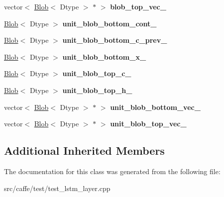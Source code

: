 \begin{DoxyCompactItemize}
vector$<$ \mbox{\hyperlink{classcaffe_1_1_blob}{Blob}}$<$ Dtype $>$ $\ast$ $>$ {\bfseries blob\+\_\+top\+\_\+vec\+\_\+}
\item 
\mbox{\label{classcaffe_1_1_l_s_t_m_layer_test_a0145a3210ea86535dd6d2494cb0c3e91}} 
\mbox{\hyperlink{classcaffe_1_1_blob}{Blob}}$<$ Dtype $>$ {\bfseries unit\+\_\+blob\+\_\+bottom\+\_\+cont\+\_\+}
\item 
\mbox{\label{classcaffe_1_1_l_s_t_m_layer_test_ae8e692439500ffac5b524a8c478efa41}} 
\mbox{\hyperlink{classcaffe_1_1_blob}{Blob}}$<$ Dtype $>$ {\bfseries unit\+\_\+blob\+\_\+bottom\+\_\+c\+\_\+prev\+\_\+}
\item 
\mbox{\label{classcaffe_1_1_l_s_t_m_layer_test_aed58f00afd992ce570fdf24ee0180273}} 
\mbox{\hyperlink{classcaffe_1_1_blob}{Blob}}$<$ Dtype $>$ {\bfseries unit\+\_\+blob\+\_\+bottom\+\_\+x\+\_\+}
\item 
\mbox{\label{classcaffe_1_1_l_s_t_m_layer_test_a4f7809d6c0bb1ac211690d122333e543}} 
\mbox{\hyperlink{classcaffe_1_1_blob}{Blob}}$<$ Dtype $>$ {\bfseries unit\+\_\+blob\+\_\+top\+\_\+c\+\_\+}
\item 
\mbox{\label{classcaffe_1_1_l_s_t_m_layer_test_ae1b7ba66b9da400361b4c8a2bbecaced}} 
\mbox{\hyperlink{classcaffe_1_1_blob}{Blob}}$<$ Dtype $>$ {\bfseries unit\+\_\+blob\+\_\+top\+\_\+h\+\_\+}
\item 
\mbox{\label{classcaffe_1_1_l_s_t_m_layer_test_aa77835d7725c7fca2d4adbd609609499}} 
vector$<$ \mbox{\hyperlink{classcaffe_1_1_blob}{Blob}}$<$ Dtype $>$ $\ast$ $>$ {\bfseries unit\+\_\+blob\+\_\+bottom\+\_\+vec\+\_\+}
\item 
\mbox{\label{classcaffe_1_1_l_s_t_m_layer_test_a94af155a42908dde5a918de136fe0c0b}} 
vector$<$ \mbox{\hyperlink{classcaffe_1_1_blob}{Blob}}$<$ Dtype $>$ $\ast$ $>$ {\bfseries unit\+\_\+blob\+\_\+top\+\_\+vec\+\_\+}
\end{DoxyCompactItemize}
\subsection*{Additional Inherited Members}


The documentation for this class was generated from the following file\+:\begin{DoxyCompactItemize}
\item 
src/caffe/test/test\+\_\+lstm\+\_\+layer.\+cpp\end{DoxyCompactItemize}
